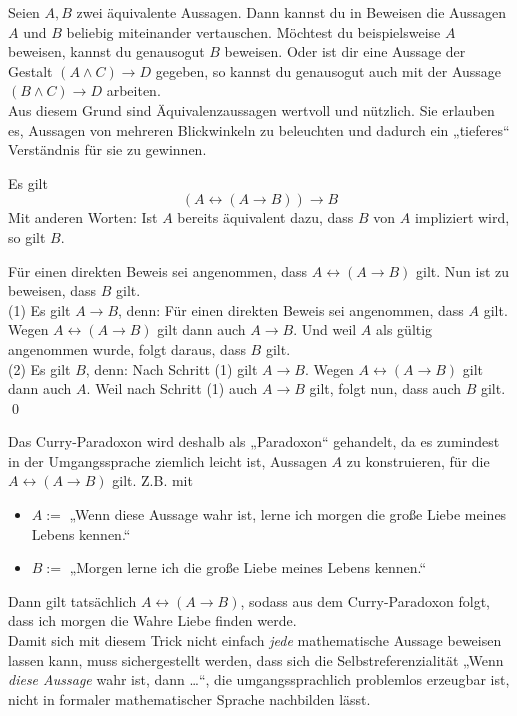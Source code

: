 \begin{bem}[Substitutionsprinzip]
 Seien $A,B$ zwei äquivalente Aussagen. Dann kannst du in Beweisen die Aussagen $A$ und $B$ beliebig miteinander vertauschen. Möchtest du beispielsweise $A$ beweisen, kannst du genausogut $B$ beweisen. Oder ist dir eine Aussage der Gestalt $(A\land C)\to D$ gegeben, so kannst du genausogut auch mit der Aussage $(B\land C)\to D$ arbeiten. \\
 Aus diesem Grund sind Äquivalenzaussagen wertvoll und nützlich. Sie erlauben es, Aussagen von mehreren Blickwinkeln zu beleuchten und dadurch ein „tieferes“ Verständnis für sie zu gewinnen.
\end{bem}




\begin{sat}
 Es gilt
 \[ (A\leftrightarrow (A\to B))\to B \]
 Mit anderen Worten: Ist $A$ bereits äquivalent dazu, dass $B$ von $A$ impliziert wird, so gilt $B$.
\end{sat}
\begin{bew}
 Für einen direkten Beweis sei angenommen, dass $A\leftrightarrow (A\to B)$ gilt. Nun ist zu beweisen, dass $B$ gilt. \\[0.5em]
 (1) Es gilt $A\to B$, denn: Für einen direkten Beweis sei angenommen, dass $A$ gilt. Wegen $A\leftrightarrow (A\to B)$ gilt dann auch $A\to B$. Und weil $A$ als gültig angenommen wurde, folgt daraus, dass $B$ gilt. \\[0.5em]
 (2) Es gilt $B$, denn: Nach Schritt (1) gilt $A\to B$. Wegen $A\leftrightarrow (A\to B)$ gilt dann auch $A$. Weil nach Schritt (1) auch $A\to B$ gilt, folgt nun, dass auch $B$ gilt. \qed
\end{bew}



\begin{bem}[*]
Das Curry-Paradoxon wird deshalb als „Paradoxon“ gehandelt, da es zumindest in der Umgangssprache ziemlich leicht ist, Aussagen $A$ zu konstruieren, für die $A\leftrightarrow (A\to B)$ gilt. Z.B. mit
\begin{itemize}
 \item $A:=$ „Wenn diese Aussage wahr ist, lerne ich morgen die große Liebe meines Lebens kennen.“
 \item $B:=$ „Morgen lerne ich die große Liebe meines Lebens kennen.“
\end{itemize}
Dann gilt tatsächlich $A\leftrightarrow (A\to B)$, sodass aus dem Curry-Paradoxon folgt, dass ich morgen die Wahre Liebe finden werde. \\
Damit sich mit diesem Trick nicht einfach \emph{jede} mathematische Aussage beweisen lassen kann, muss sichergestellt werden, dass sich die Selbstreferenzialität „Wenn \emph{diese Aussage} wahr ist, dann \dots“, die umgangssprachlich problemlos erzeugbar ist, nicht in formaler mathematischer Sprache nachbilden lässt.
\end{bem}


